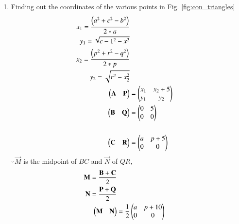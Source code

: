 \begin{enumerate}[label=\thesection.\arabic*.,ref=\thesection.\theenumi]
%
\item Finding out  the coordinates of the various points in Fig. \ref{fig:con_triangles}
\label{const:con_triangles}
\\
% 
\begin{align}
\label{eq:constr_a}
x_1 = \frac{\left(a^2 + c^2 - b^2\right)}{2*a}
\\
y_1 = \sqrt{c-1^2 - x^2}
\\
x_2 = \frac{\left(p^2 + r^2 - q^2\right)}{2*p}
\\
y_2 = \sqrt{r^2 - x_2^2}
\\
\begin{pmatrix}\mathbf{A} & \mathbf{P}\end{pmatrix} &= \begin{pmatrix}x_1  &  x_2 + 5\\ y_1 & y_2\end{pmatrix}
\\
\begin{pmatrix}\mathbf{B} & \mathbf{Q}\end{pmatrix} &= \begin{pmatrix}0  &  5\\ 0 & 0\end{pmatrix}
\\
\label{eq:constr_c}
\\
\begin{pmatrix}\mathbf{C} & \mathbf{R}\end{pmatrix} &= \begin{pmatrix}a  &  p + 5\\ 0 & 0\end{pmatrix}
\\
\label{eq:constr_b}
\end{align}
$\because \vec{M}$ is the midpoint of $BC$ and $\vec{N}$ of $QR$,
\begin{align}
\mathbf{M}= \frac{\mathbf{B}+\mathbf{C}}{2}
\\
\mathbf{N}= \frac{\mathbf{P}+\mathbf{Q}}{2}
\\
\begin{pmatrix}\mathbf{M} & \mathbf{N}\end{pmatrix} &= \frac{1}{2}\begin{pmatrix}a & p+10\\0 & 0\end{pmatrix}
\label{eq:constr_m}
\end{align}

 


\end{enumerate}
